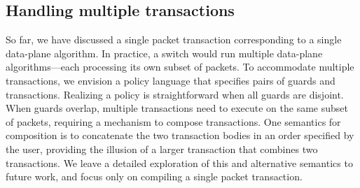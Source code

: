 
\subsection{Handling multiple transactions}
\label{ss:multiple}
So far, we have discussed a single packet transaction corresponding to a single
data-plane algorithm. In practice, a switch
would run multiple data-plane algorithms---each processing its own subset of
packets. To accommodate multiple transactions, we envision a policy
language that specifies pairs of guards and transactions. Realizing a policy is
straightforward when all guards are disjoint. When guards overlap, multiple
transactions need to execute on the same subset of packets, requiring a
mechanism to compose transactions. One semantics for composition is to concatenate the two
transaction bodies in an order specified by the user, providing the illusion of
a larger transaction that combines two transactions. We leave a detailed
exploration of this and alternative semantics to future work,
and focus only on compiling a single packet transaction.


